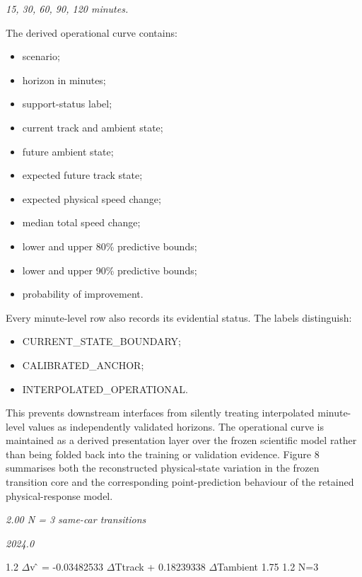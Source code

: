 \begin{center}\textit{15, 30, 60, 90, 120 minutes.}\end{center}

The derived operational curve contains:

\begin{itemize}
\item scenario;
\item horizon in minutes;
\item support-status label;
\item current track and ambient state;
\item future ambient state;
\item expected future track state;
\item expected physical speed change;
\item median total speed change;
\item lower and upper 80\% predictive bounds;
\item lower and upper 90\% predictive bounds;
\item probability of improvement.
\end{itemize}

Every minute-level row also records its evidential status. The labels distinguish:

\begin{itemize}
\item CURRENT\_STATE\_BOUNDARY;
\item CALIBRATED\_ANCHOR;
\item INTERPOLATED\_OPERATIONAL.
\end{itemize}

This prevents downstream interfaces from silently treating interpolated minute-level values as independently validated horizons. The operational curve is maintained as a derived presentation layer over the frozen scientific model rather than being folded back into the training or validation evidence. Figure 8 summarises both the reconstructed physical-state variation in the frozen transition core and the corresponding point-prediction behaviour of the retained physical-response model.

\begin{center}\textit{2.00 N = 3 same-car transitions}\end{center}

\begin{center}\textit{2024.0}\end{center}

1.2 \ensuremath{\Delta}v ̂ = -0.03482533 \ensuremath{\Delta}Ttrack + 0.18239338 \ensuremath{\Delta}Tambient 1.75 1.2 N=3


